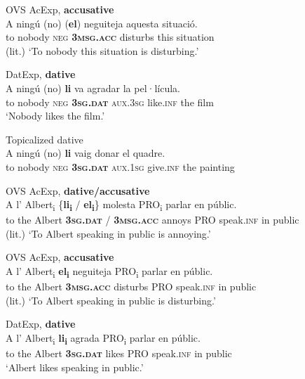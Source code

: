 \documentclass[output=paper,colorlinks,citecolor=brown,modfonts,nonflat]{langsci/langscibook}
\begin{document}
 \ex OVS AcExp, \textbf{accusative} \label{ex:royo:11b}\\
 \gll A ningú (no) (\textbf{el}) neguiteja aquesta situació.\\
  to nobody \textsc{neg} \textbf{\textsc{3msg.acc}} disturbs this situation\\
\glt (lit.) ‘To nobody this situation is disturbing.’

 \ex  DatExp, \textbf{dative} \label{ex:royo:11c}\\
 \gll  A ningú (no) \textbf{li} va agradar la pel·lícula.\\
 to nobody \textsc{neg} \textbf{\textsc{3sg.dat}} \textsc{aux.3sg} like.\textsc{inf} the film\\
\glt ‘Nobody likes the film.’


 \ex Topicalized dative \label{ex:royo:11d}\\
 \gll  *A ningú (no) \textbf{li} vaig donar el quadre.\\
 to nobody \textsc{neg} \textbf{\textsc{3sg.dat}} \textsc{aux.1sg} give.\textsc{inf} the painting\\
\glt

  \z
  \z


\ea%
 \label{ex:royo:12}
 \ea OVS AcExp, \textbf{dative/accusative} \label{ex:royo:12a}\\
 \gll  A l’ Albert\textsubscript{i} \{\textbf{li\textsubscript{i}} / \textbf{el\textsubscript{i}}\} molesta PRO\textsubscript{i} parlar en públic.\\
 to the Albert \textbf{\textsc{3sg.dat}} / \textbf{\textsc{3msg.acc}} annoys PRO speak.\textsc{inf} in public\\
 \glt (lit.) ‘To Albert speaking in public is annoying.’

 \ex OVS AcExp, \textbf{accusative}\label{ex:royo:12b}\\
 \gll A l’ Albert\textsubscript{i} \textbf{el\textsubscript{i}} neguiteja PRO\textsubscript{i} parlar en públic.\\
  to the Albert \textbf{\textsc{3msg.acc}} disturbs PRO speak.\textsc{inf} in public\\
\glt (lit.) ‘To Albert speaking in public is disturbing.’

 \ex DatExp, \textbf{dative}\label{ex:royo:12c}\\
 \gll A l’ Albert\textsubscript{i} \textbf{li\textsubscript{i}} agrada PRO\textsubscript{i} parlar en públic.\\
 to the Albert \textbf{\textsc{3sg.dat}} likes PRO speak.\textsc{inf} in public\\
\glt ‘Albert likes speaking in public.’
\end{document}

